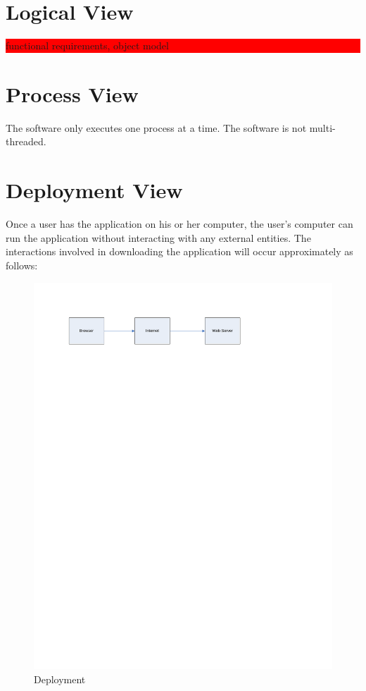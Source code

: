 \documentclass{article}
\newcommand{\todo}[1]{\colorbox{red}{\begin{minipage}{\textwidth}{#1}\end{minipage}}}
\begin{document}
\section{Logical View}
\todo{functional requirements, object model}

\section{Process View}
The software only executes one process at a time. The software is not multi-threaded.

\section{Deployment View}
Once a user has the application on his or her computer, the user's computer can run the application without interacting with any external entities.
The interactions involved in downloading the application will occur approximately as follows:
\begin{figure}[!htb]
\centering
\includegraphics[width=\textwidth]{./diagrams/deployment}
\caption{Deployment}
\end{figure} 
\end{document}
